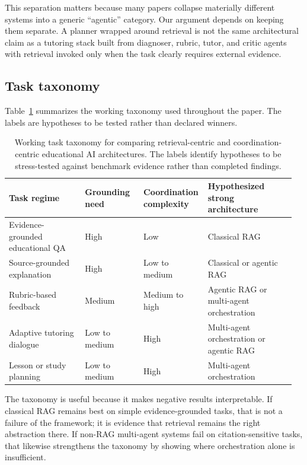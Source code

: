 This separation matters because many papers collapse materially different systems into a generic ``agentic'' category. Our argument depends on keeping them separate. A planner wrapped around retrieval is not the same architectural claim as a tutoring stack built from diagnoser, rubric, tutor, and critic agents with retrieval invoked only when the task clearly requires external evidence.

\subsection{Task taxonomy}

Table~\ref{tab:task-taxonomy} summarizes the working taxonomy used throughout the paper. The labels are hypotheses to be tested rather than declared winners.

\begin{table}[t]
\centering
\small
\begingroup
\setlength{\tabcolsep}{4pt}
\begin{tabular}{@{}>{\raggedright\arraybackslash}p{0.26\linewidth}>{\raggedright\arraybackslash}p{0.2\linewidth}>{\raggedright\arraybackslash}p{0.2\linewidth}>{\raggedright\arraybackslash}p{0.3\linewidth}@{}}
\toprule
Task regime & Grounding need & \shortstack[c]{Coordination\\complexity} & \shortstack[c]{Hypothesized strong\\architecture} \\
\midrule
Evidence-grounded educational QA & High & Low & Classical RAG \\
Source-grounded explanation & High & Low to medium & Classical or agentic RAG \\
Rubric-based feedback & Medium & Medium to high & Agentic RAG or multi-agent orchestration \\
Adaptive tutoring dialogue & Low to medium & High & Multi-agent orchestration or agentic RAG \\
Lesson or study planning & Low to medium & High & Multi-agent orchestration \\
\bottomrule
\end{tabular}
\endgroup
\caption{Working task taxonomy for comparing retrieval-centric and coordination-centric educational AI architectures. The labels identify hypotheses to be stress-tested against benchmark evidence rather than completed findings.}
\label{tab:task-taxonomy}
\end{table}

The taxonomy is useful because it makes negative results interpretable. If classical RAG remains best on simple evidence-grounded tasks, that is not a failure of the framework; it is evidence that retrieval remains the right abstraction there. If non-RAG multi-agent systems fail on citation-sensitive tasks, that likewise strengthens the taxonomy by showing where orchestration alone is insufficient.

